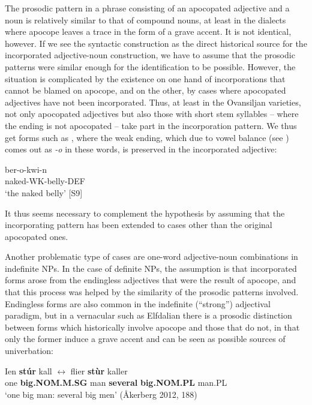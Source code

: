 The prosodic pattern in a phrase consisting of an apocopated adjective and a noun is relatively similar to that of compound nouns, at least in the dialects where apocope leaves a trace in the form of a grave accent. It is not identical, however. If we see the syntactic construction as the direct historical source for the incorporated adjective-noun construction, we have to assume that the prosodic patterns were similar enough for the identification to be possible. However, the situation is complicated by the existence on one hand of incorporations that cannot be blamed on apocope, and on the other, by cases where apocopated adjectives have not been incorporated. Thus, at least in the Ovansiljan varieties, not only apocopated adjectives but also those with short stem syllables – where the ending is not apocopated – take part in the incorporation pattern. We thus get forms such as , where the weak ending, which due to vowel balance (see ) comes out as\textit{ {}-o} in these words, is preserved in the incorporated adjective:

\ea\label{}
\gll ber-o-kwi-n\\
naked-WK-belly-DEF\\
\glt ‘the naked belly’ [S9]
\z

It thus seems necessary to complement the hypothesis by assuming that the incorporating pattern has been extended to cases other than the original apocopated ones.

Another problematic type of cases are one-word adjective-noun combinations in indefinite NPs. In the case of definite NPs, the assumption is that incorporated forms arose from the endingless adjectives that were the result of apocope, and that this process was helped by the similarity of the prosodic patterns involved. Endingless forms are also common in the indefinite (“strong”) adjectival paradigm, but in a vernacular such as Elfdalian there is a prosodic distinction between forms which historically involve apocope and those that do not, in that only the former induce a grave accent and can be seen as possible sources of univerbation:

\ea\label{}
\gll Ien  \textbf{stúr} kall   \textbf{$\leftrightarrow $} flier\textbf{  stùr} kaller\\
one  \textbf{big.NOM.M.SG} man   \textbf{several} \textbf{big.NOM.PL} man.PL\\
\glt ‘one big man: several big men’ (Åkerberg 2012, 188)
\z

